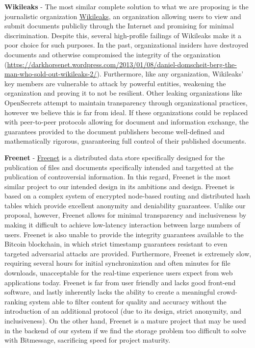 \documentclass[letterpaper,10pt,oneside]{sphinxmanual}
\begin{document}
\textbf{Wikileaks} - The most similar complete solution to what we are proposing is the journalistic organization \href{http://wikileaks.org/}{Wikileaks}, an organization allowing users to view and submit documents publicliy through the Internet and
promising for minimal discrimination.  Despite this, several high-profile failings of Wikileaks make it a poor choice for such
purposes.  In the past, organizational insiders have destroyed documents and otherwise compromised the integrity of the
organization (\href{https://darkhorsenet.wordpress.com/2013/01/08/daniel-domscheit-berg-the-man-who-sold-out-wikileaks-2/}{https://darkhorsenet.wordpress.com/2013/01/08/daniel-domscheit-berg-the-man-who-sold-out-wikileaks-2/}).
Furthermore, like any organization, Wikileaks’ key members are vulnerable to attack by powerful entities, weakening the
organization and proving it to not be resilient.  Other leaking organizations like OpenSecrets attempt to maintain transparency
through organizational practices, however we believe this is far from ideal.  If these organizations could be replaced with
peer-to-peer protocols allowing for document and information exchange, the guarantees provided to the document publishers become
well-defined and mathematically rigorous, guaranteeing full control of their published documents.

\textbf{Freenet} - \href{https://freenetproject.org/}{Freenet} is a distributed data store specifically designed for the publication of
files and documents specifically intended and targetted at the publication of controversial information.  In this regard,
Freenet is the most similar project to our intended design in its ambitions and design.  Freenet is based on a complex system of
encrypted node-based routing and distributed hash tables which provide excellent anonymity and deniability guarantees.  Unlike
our proposal, however, Freenet allows for minimal transparency and inclusiveness by making it difficult to achieve low-latency
interaction between large numbers of users.  Freenet is also unable to provide the integrity guarantees available to the Bitcoin
blockchain, in which strict timestamp guarantees resistant to even targeted adversarial attacks are provided.  Furthermore,
Freenet is extremely slow, requiring several hours for initial synchronization and often minutes for file downloads,
unacceptable for the real-time experience users expect from web applications today.  Freenet is far from user friendly and lacks
good front-end software, and lastly inherently lacks the ability to create a meaningful crowd-ranking system able to filter
content for quality and accuracy without the introduction of an additional protocol (due to its design, strict anonymity, and
inclusiveness).  On the other hand, Freenet is a mature project that may be used in the backend of our system if we find the
storage problem too difficult to solve with Bitmessage, sacrificing speed for project maturity.
\end{document}
